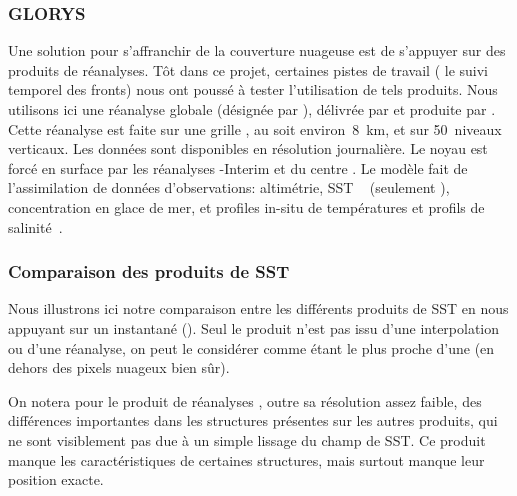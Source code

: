\subsubsection{GLORYS}

Une solution pour s'affranchir de la couverture nuageuse est de s'appuyer sur des produits de réanalyses.
Tôt dans ce projet, certaines pistes de travail ( le suivi temporel des fronts) nous ont poussé à tester l'utilisation de tels produits.
Nous utilisons ici une réanalyse globale (désignée par ), délivrée par  et produite par .
Cette réanalyse est faite sur une grille , au  soit environ~\qty{8}{\km}, et sur 50~niveaux verticaux. Les données sont disponibles en résolution journalière.
Le noyau  est forcé en surface par les réanalyses -Interim et  du centre .
Le modèle fait de l'assimilation de données d'observations: altimétrie, SST ~ (seulement ), concentration en glace de mer, et profiles in-situ de températures et profils de salinité~.

\subsubsection{Comparaison des produits de SST}

\begin{figure}
  \label{fig:comparaison-sst}
\end{figure}

Nous illustrons ici notre comparaison entre les différents produits de SST en nous appuyant sur un instantané ().
Seul le produit  n'est pas issu d'une interpolation ou d'une réanalyse, on peut le considérer comme étant le plus proche d'une  (en dehors des pixels nuageux bien sûr).

On notera pour le produit de réanalyses , outre sa résolution assez faible, des différences importantes dans les structures présentes sur les autres produits, qui ne sont visiblement pas due à un simple lissage du champ de SST.
Ce produit manque les caractéristiques de certaines structures, mais surtout manque leur position exacte.

